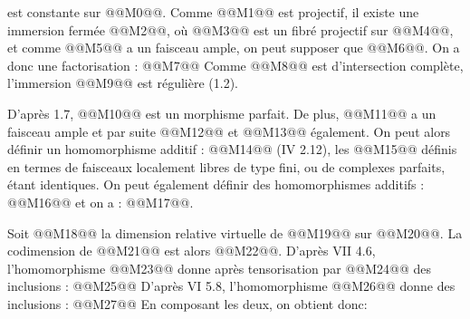 
est constante sur @@M0@@. Comme @@M1@@ est projectif, il existe une immersion fermée @@M2@@, où @@M3@@ est un fibré projectif sur @@M4@@, et comme @@M5@@ a un faisceau ample, on peut supposer que @@M6@@. On a donc une factorisation :
@@M7@@
Comme @@M8@@ est d'intersection complète, l'immersion @@M9@@ est régulière (1.2).

D'après 1.7, @@M10@@ est un morphisme parfait. De plus, @@M11@@ a un faisceau ample et par suite @@M12@@ et @@M13@@ également. On peut alors définir un homomorphisme additif :
@@M14@@
(IV 2.12), les @@M15@@ définis en termes de faisceaux localement libres de type fini, ou de complexes parfaits, étant identiques. On peut également définir des homomorphismes additifs :
@@M16@@
et on a : @@M17@@.

Soit @@M18@@ la dimension relative virtuelle de @@M19@@ sur @@M20@@. La codimension de @@M21@@ est alors @@M22@@. D'après VII 4.6, l'homomorphisme @@M23@@ donne après tensorisation par @@M24@@ des inclusions :
@@M25@@
D'après VI 5.8, l'homomorphisme @@M26@@ donne des inclusions :
@@M27@@
En composant les deux, on obtient donc:

